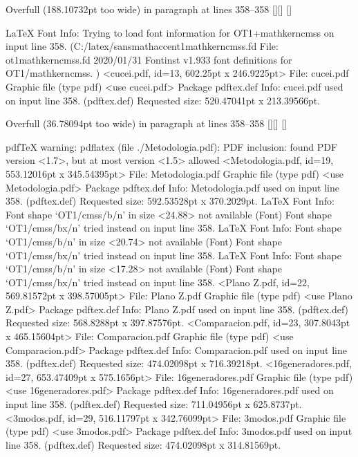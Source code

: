 Overfull \hbox (188.10732pt too wide) in paragraph at lines 358--358
[][] 
 []

LaTeX Font Info:    Trying to load font information for OT1+mathkerncmss on input line 358.
(C:\Users\SEARS\AppData\Local\Programs\MiKTeX\tex/latex/sansmathaccent\ot1mathkerncmss.fd
File: ot1mathkerncmss.fd 2020/01/31 Fontinst v1.933 font definitions for OT1/mathkerncmss.
)
<cucei.pdf, id=13, 602.25pt x 246.9225pt>
File: cucei.pdf Graphic file (type pdf)
<use cucei.pdf>
Package pdftex.def Info: cucei.pdf  used on input line 358.
(pdftex.def)             Requested size: 520.47041pt x 213.39566pt.

Overfull \hbox (36.78094pt too wide) in paragraph at lines 358--358
 [][] 
 []



pdfTeX warning: pdflatex (file ./Metodologia.pdf): PDF inclusion: found PDF version <1.7>, but at most version <1.5> allowed
<Metodologia.pdf, id=19, 553.12016pt x 345.54395pt>
File: Metodologia.pdf Graphic file (type pdf)
<use Metodologia.pdf>
Package pdftex.def Info: Metodologia.pdf  used on input line 358.
(pdftex.def)             Requested size: 592.53528pt x 370.2029pt.
LaTeX Font Info:    Font shape `OT1/cmss/b/n' in size <24.88> not available
(Font)              Font shape `OT1/cmss/bx/n' tried instead on input line 358.
LaTeX Font Info:    Font shape `OT1/cmss/b/n' in size <20.74> not available
(Font)              Font shape `OT1/cmss/bx/n' tried instead on input line 358.
LaTeX Font Info:    Font shape `OT1/cmss/b/n' in size <17.28> not available
(Font)              Font shape `OT1/cmss/bx/n' tried instead on input line 358.
<Plano Z.pdf, id=22, 569.81572pt x 398.57005pt>
File: Plano Z.pdf Graphic file (type pdf)
<use Plano Z.pdf>
Package pdftex.def Info: Plano Z.pdf  used on input line 358.
(pdftex.def)             Requested size: 568.8288pt x 397.87576pt.
<Comparacion.pdf, id=23, 307.8043pt x 465.15604pt>
File: Comparacion.pdf Graphic file (type pdf)
<use Comparacion.pdf>
Package pdftex.def Info: Comparacion.pdf  used on input line 358.
(pdftex.def)             Requested size: 474.02098pt x 716.39218pt.
<16generadores.pdf, id=27, 653.47409pt x 575.1656pt>
File: 16generadores.pdf Graphic file (type pdf)
<use 16generadores.pdf>
Package pdftex.def Info: 16generadores.pdf  used on input line 358.
(pdftex.def)             Requested size: 711.04956pt x 625.8737pt.
<3modos.pdf, id=29, 516.11797pt x 342.76099pt>
File: 3modos.pdf Graphic file (type pdf)
<use 3modos.pdf>
Package pdftex.def Info: 3modos.pdf  used on input line 358.
(pdftex.def)             Requested size: 474.02098pt x 314.81569pt.

